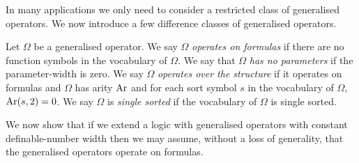 \documentclass[../main/thesis.tex]{subfiles}
\begin{document}
In many applications we only need to consider a restricted class of generalised
operators. We now introduce a few difference classes of generalised operators.

\begin{definition}
  Let $\Omega$ be a generalised operator. We say $\Omega$ \emph{operates on
    formulas} if there are no function symbols in the vocabulary of $\Omega$. We
  say that $\Omega$ \emph{has no parameters} if the parameter-width is zero. We
  say $\Omega$ \emph{operates over the structure} if it operates on formulas and
  $\Omega$ has arity $\text{\upshape Ar}$ and for each sort symbol $s$ in the vocabulary of
  $\Omega$, $\text{\upshape Ar}(s, 2) = 0$. We say $\Omega$ is \emph{single sorted} if the
  vocabulary of $\Omega$ is single sorted.
\end{definition}

We now show that if we extend a logic with generalised operators with constant
definable-number width then we may assume, without a loss of generality, that
the generalised operators operate on formulas.
\end{document}
